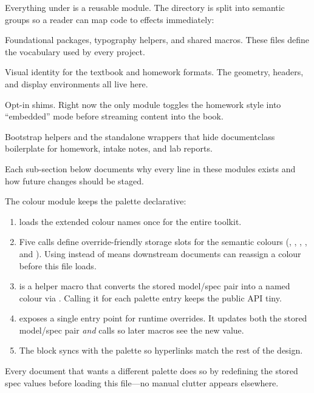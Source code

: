 \label{ch:tex-library}

\label{sec:tex-lib}

Everything under  is a reusable module. The directory is split
into semantic groups so a reader can map code to effects immediately:
\begin{description}[leftmargin=2.4em,labelwidth=2.2em]
  \item[\texttt{core/}] Foundational packages, typography helpers, and shared
    macros. These files define the vocabulary used by every project.
  \item[\texttt{styles/}] Visual identity for the textbook and homework formats.
    The geometry, headers, and display environments all live here.
  \item[\texttt{modules/}] Opt-in shims. Right now the only module toggles the
    homework style into ``embedded'' mode before streaming content into the book.
  \item[\texttt{system/}] Bootstrap helpers and the standalone wrappers that
    hide documentclass boilerplate for homework, intake notes, and lab reports.
\end{description}
Each sub-section below documents why every line in these modules exists and how
future changes should be staged.

\label{sec:core-colors}

The colour module keeps the palette declarative:
\begin{enumerate}[leftmargin=2em]
  \item \InlineMacro{\usepackage[dvipsnames]{xcolor}} loads the extended colour
        names once for the entire toolkit.
  \item Five \InlineMacro{\providecommand} calls define override-friendly storage
        slots for the semantic colours (, ,
        , , and ).
        Using \InlineMacro{\providecommand} instead of \InlineMacro{\newcommand}
        means downstream documents can reassign a colour before this file loads.
  \item \InlineMacro{\MathColorDefine} is a helper macro that converts the stored
        model/spec pair into a named colour via \InlineMacro{\definecolor}.
        Calling it for each palette entry keeps the public API tiny.
  \item \InlineMacro{\MathColorOverride} exposes a single entry point for runtime
        overrides. It updates both the stored model/spec pair \emph{and} calls
        \InlineMacro{\MathColorDefine} so later macros see the new value.
  \item The \InlineMacro{\AtBeginDocument} block syncs \InlineMacro{\hypersetup}
        with the palette so hyperlinks match the rest of the design.
\end{enumerate}
Every document that wants a different palette does so by redefining the stored
spec values before loading this file—no manual \InlineMacro{\definecolor}
clutter appears elsewhere.

